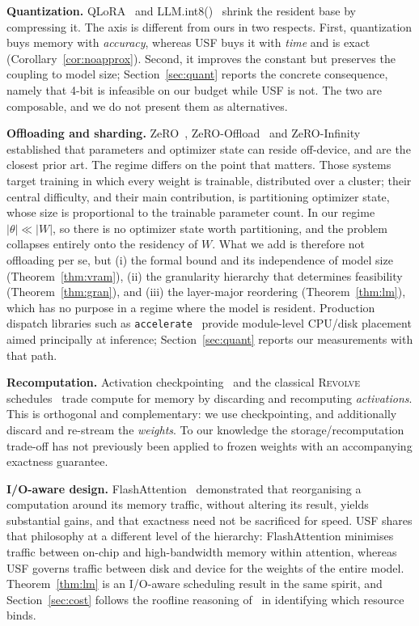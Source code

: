 \documentclass[preprint,12pt]{elsarticle}
\newcommand{\usf}{USF}
\begin{document}
\textbf{Quantization.} QLoRA~\cite{dettmers2023qlora} and LLM.int8()~\cite{dettmers2022int8}
shrink the resident base by compressing it. The axis is different from ours in two respects.
First, quantization buys memory with \emph{accuracy}, whereas \usf{} buys it with \emph{time} and
is exact (Corollary~\ref{cor:noapprox}). Second, it improves the constant but preserves the coupling to
model size; Section~\ref{sec:quant} reports the concrete consequence, namely that 4-bit is infeasible on
our budget while \usf{} is not. The two are composable, and we do not present them as
alternatives.

\textbf{Offloading and sharding.} ZeRO~\cite{rajbhandari2020zero},
ZeRO-Offload~\cite{ren2021zerooffload} and ZeRO-Infinity~\cite{rajbhandari2021zeroinfinity}
established that parameters and optimizer state can reside off-device, and are the closest prior
art. The regime differs on the point that matters. Those systems target training in which every
weight is trainable, distributed over a cluster; their central difficulty, and their main
contribution, is partitioning optimizer state, whose size is proportional to the trainable
parameter count. In our regime $|\theta| \ll |W|$, so there is no optimizer state worth
partitioning, and the problem collapses entirely onto the residency of $W$. What we add is
therefore not offloading per se, but (i) the formal bound and its independence of model size
(Theorem~\ref{thm:vram}), (ii) the granularity hierarchy that determines feasibility
(Theorem~\ref{thm:gran}), and (iii) the layer-major reordering (Theorem~\ref{thm:lm}), which has no purpose in a
regime where the model is resident. Production dispatch libraries such as
\texttt{accelerate}~\cite{accelerate2022} provide module-level CPU/disk placement aimed principally
at inference; Section~\ref{sec:quant} reports our measurements with that path.

\textbf{Recomputation.} Activation checkpointing~\cite{chen2016checkpointing} and the classical
\textsc{Revolve} schedules~\cite{griewank2000revolve} trade compute for memory by discarding and
recomputing \emph{activations}. This is orthogonal and complementary: we use checkpointing, and
additionally discard and re-stream the \emph{weights}. To our knowledge the storage/recomputation
trade-off has not previously been applied to frozen weights with an accompanying exactness
guarantee.

\textbf{I/O-aware design.} FlashAttention~\cite{dao2022flashattention} demonstrated that
reorganising a computation around its memory traffic, without altering its result, yields
substantial gains, and that exactness need not be sacrificed for speed. \usf{} shares
that philosophy at a different level of the hierarchy: FlashAttention minimises traffic between
on-chip and high-bandwidth memory within attention, whereas \usf{} governs traffic between disk and
device for the weights of the entire model. Theorem~\ref{thm:lm} is an I/O-aware scheduling result in the
same spirit, and Section~\ref{sec:cost} follows the roofline reasoning of~\cite{williams2009roofline} in
identifying which resource binds.
\end{document}
